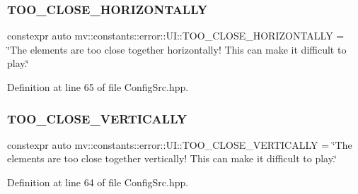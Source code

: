 \subsubsection{T\+O\+O\+\_\+\+C\+L\+O\+S\+E\+\_\+\+H\+O\+R\+I\+Z\+O\+N\+T\+A\+L\+LY}
{\footnotesize\ttfamily constexpr auto mv\+::constants\+::error\+::\+U\+I\+::\+T\+O\+O\+\_\+\+C\+L\+O\+S\+E\+\_\+\+H\+O\+R\+I\+Z\+O\+N\+T\+A\+L\+LY = \char`\"{}The elements are too close together horizontally! This can make it difficult to play.\char`\"{}}



Definition at line 65 of file Config\+Src.\+hpp.

\mbox{\label{namespacemv_1_1constants_1_1error_1_1_u_i_a1b19c331663be293a9f3a1eeef97a2ff}} 
\subsubsection{T\+O\+O\+\_\+\+C\+L\+O\+S\+E\+\_\+\+V\+E\+R\+T\+I\+C\+A\+L\+LY}
{\footnotesize\ttfamily constexpr auto mv\+::constants\+::error\+::\+U\+I\+::\+T\+O\+O\+\_\+\+C\+L\+O\+S\+E\+\_\+\+V\+E\+R\+T\+I\+C\+A\+L\+LY = \char`\"{}The elements are too close together vertically! This can make it difficult to play.\char`\"{}}



Definition at line 64 of file Config\+Src.\+hpp.

